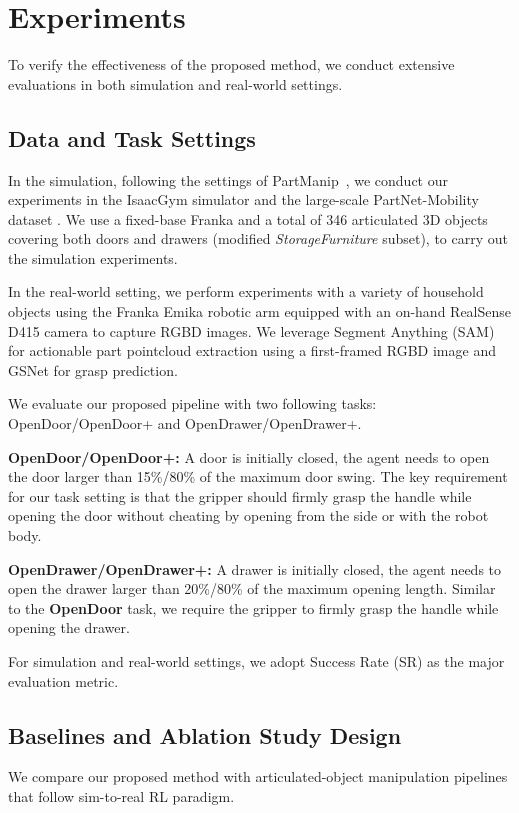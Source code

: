 

\section{Experiments}
To verify the effectiveness of the proposed method, we conduct extensive evaluations in both
simulation and real-world settings.

\subsection{Data and Task Settings}
In the simulation, following the settings of PartManip~\cite{partmanip}, we conduct our experiments in the IsaacGym simulator and the large-scale PartNet-Mobility dataset \cite{partnet}. We use a fixed-base Franka and a total of 346 articulated 3D objects covering both doors and drawers (modified \textit{StorageFurniture} subset), to carry out the simulation experiments.

In the real-world setting, we perform experiments with a variety of household objects using the Franka Emika robotic arm equipped with an on-hand RealSense D415 camera to capture RGBD images. We leverage Segment Anything (SAM) \cite{kirillov2023segment} for actionable part pointcloud extraction using a first-framed RGBD image and GSNet \cite{gsnet} for grasp prediction.

We evaluate our proposed pipeline with two following tasks: OpenDoor/OpenDoor+ and OpenDrawer/OpenDrawer+. 

\textbf{OpenDoor/OpenDoor+: }A door is initially closed, the agent needs to open the door larger than 15\%/80\% of the maximum door swing. The key requirement for our task setting is that the gripper should firmly grasp the handle while opening the door without cheating by opening from the side or with the robot body.

\textbf{OpenDrawer/OpenDrawer+: }A drawer is initially closed, the agent needs to open the drawer larger than 20\%/80\% of the maximum opening length. Similar to the \textbf{OpenDoor} task, we require the gripper to firmly grasp the handle while opening the drawer.

For simulation and real-world settings, we adopt Success Rate (SR) as the major evaluation metric.


\subsection{Baselines and Ablation Study Design}
We compare our proposed method with articulated-object manipulation pipelines that follow sim-to-real RL paradigm. 

